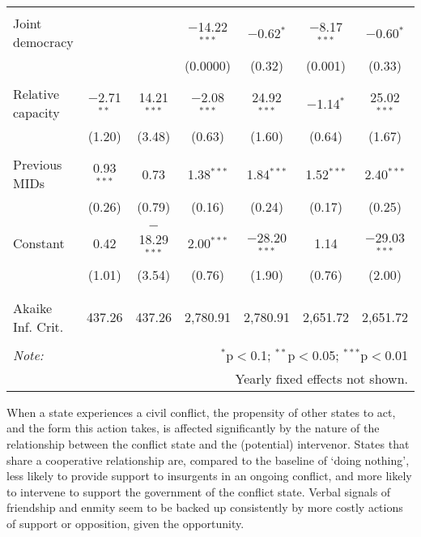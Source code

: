 \documentclass[10pt,]{article}
\begin{document}
\begin{landscape}
\begin{table}[!htbp]
\begin{tabular}{@{\extracolsep{5pt}}lcccccc}
  & & & & & & \\ 
 Joint democracy &  &  & $-$14.22$^{***}$ & $-$0.62$^{*}$ & $-$8.17$^{***}$ & $-$0.60$^{*}$ \\ 
  &  &  & (0.0000) & (0.32) & (0.001) & (0.33) \\ 
  & & & & & & \\ 
 Relative capacity & $-$2.71$^{**}$ & 14.21$^{***}$ & $-$2.08$^{***}$ & 24.92$^{***}$ & $-$1.14$^{*}$ & 25.02$^{***}$ \\ 
  & (1.20) & (3.48) & (0.63) & (1.60) & (0.64) & (1.67) \\ 
  & & & & & & \\ 
 Previous MIDs & 0.93$^{***}$ & 0.73 & 1.38$^{***}$ & 1.84$^{***}$ & 1.52$^{***}$ & 2.40$^{***}$ \\ 
  & (0.26) & (0.79) & (0.16) & (0.24) & (0.17) & (0.25) \\ 
  & & & & & & \\ 
 Constant & 0.42 & $-$18.29$^{***}$ & 2.00$^{***}$ & $-$28.20$^{***}$ & 1.14 & $-$29.03$^{***}$ \\ 
  & (1.01) & (3.54) & (0.76) & (1.90) & (0.76) & (2.00) \\ 
  & & & & & & \\ 
\hline \\[-1.8ex] 
Akaike Inf. Crit. & 437.26 & 437.26 & 2,780.91 & 2,780.91 & 2,651.72 & 2,651.72 \\ 
\hline 
\hline \\[-1.8ex] 
\textit{Note:}  & \multicolumn{6}{r}{$^{*}$p$<$0.1; $^{**}$p$<$0.05; $^{***}$p$<$0.01} \\ 
 & \multicolumn{6}{r}{Yearly fixed effects not shown.} \\ 
\end{tabular} 
\end{table} 
\end{landscape}

When a state experiences a civil conflict, the propensity of other
states to act, and the form this action takes, is affected significantly
by the nature of the relationship between the conflict state and the
(potential) intervenor. States that share a cooperative relationship
are, compared to the baseline of `doing nothing', less likely to provide
support to insurgents in an ongoing conflict, and more likely to
intervene to support the government of the conflict state. Verbal
signals of friendship and enmity seem to be backed up consistently by
more costly actions of support or opposition, given the opportunity.
\end{document}
